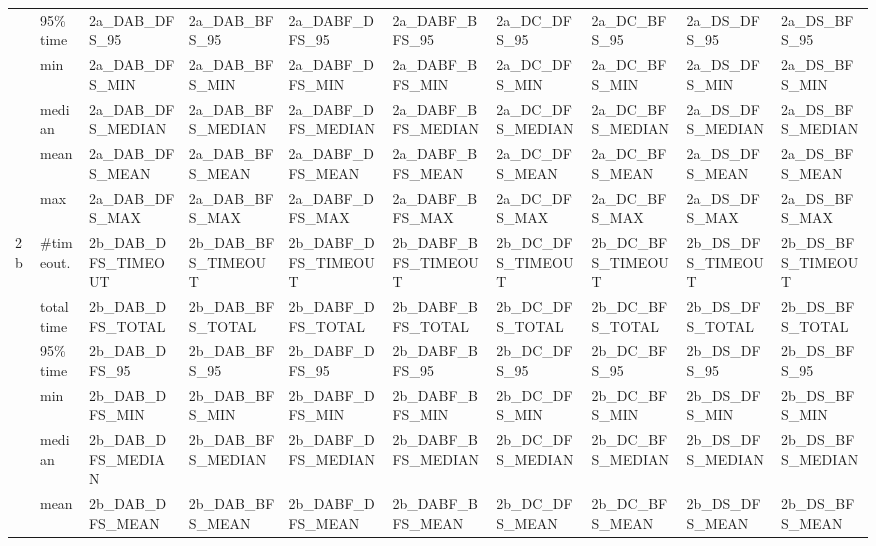 \begin{table}
{\begin{tabular}{|l|l|l|l|l|l|l|l|l|l|}
                      & 95\% time  & 2a_DAB_DFS_95      & 2a_DAB_BFS_95      & 2a_DABF_DFS_95      & 2a_DABF_BFS_95      & 2a_DC_DFS_95      & 2a_DC_BFS_95      & 2a_DS_DFS_95      & 2a_DS_BFS_95       \\ 
\cline{2-10}
                      & min        & 2a_DAB_DFS_MIN     & 2a_DAB_BFS_MIN     & 2a_DABF_DFS_MIN     & 2a_DABF_BFS_MIN     & 2a_DC_DFS_MIN     & 2a_DC_BFS_MIN     & 2a_DS_DFS_MIN     & 2a_DS_BFS_MIN       \\
                      & median     & 2a_DAB_DFS_MEDIAN  & 2a_DAB_BFS_MEDIAN  & 2a_DABF_DFS_MEDIAN  & 2a_DABF_BFS_MEDIAN  & 2a_DC_DFS_MEDIAN  & 2a_DC_BFS_MEDIAN  & 2a_DS_DFS_MEDIAN  & 2a_DS_BFS_MEDIAN       \\
                      & mean       & 2a_DAB_DFS_MEAN    & 2a_DAB_BFS_MEAN    & 2a_DABF_DFS_MEAN    & 2a_DABF_BFS_MEAN    & 2a_DC_DFS_MEAN    & 2a_DC_BFS_MEAN    & 2a_DS_DFS_MEAN    & 2a_DS_BFS_MEAN       \\
                      & max        & 2a_DAB_DFS_MAX     & 2a_DAB_BFS_MAX     & 2a_DABF_DFS_MAX     & 2a_DABF_BFS_MAX     & 2a_DC_DFS_MAX     & 2a_DC_BFS_MAX     & 2a_DS_DFS_MAX     & 2a_DS_BFS_MAX       \\
\hline
\hline
\multirow{7}{*}{2b}   & \#timeout. & 2b_DAB_DFS_TIMEOUT & 2b_DAB_BFS_TIMEOUT & 2b_DABF_DFS_TIMEOUT & 2b_DABF_BFS_TIMEOUT & 2b_DC_DFS_TIMEOUT & 2b_DC_BFS_TIMEOUT & 2b_DS_DFS_TIMEOUT & 2b_DS_BFS_TIMEOUT  \\
                      & total time & 2b_DAB_DFS_TOTAL   & 2b_DAB_BFS_TOTAL   & 2b_DABF_DFS_TOTAL   & 2b_DABF_BFS_TOTAL   & 2b_DC_DFS_TOTAL   & 2b_DC_BFS_TOTAL   & 2b_DS_DFS_TOTAL   & 2b_DS_BFS_TOTAL    \\
                      & 95\% time  & 2b_DAB_DFS_95      & 2b_DAB_BFS_95      & 2b_DABF_DFS_95      & 2b_DABF_BFS_95      & 2b_DC_DFS_95      & 2b_DC_BFS_95      & 2b_DS_DFS_95      & 2b_DS_BFS_95       \\ 
\cline{2-10}
                      & min        & 2b_DAB_DFS_MIN     & 2b_DAB_BFS_MIN     & 2b_DABF_DFS_MIN     & 2b_DABF_BFS_MIN     & 2b_DC_DFS_MIN     & 2b_DC_BFS_MIN     & 2b_DS_DFS_MIN     & 2b_DS_BFS_MIN       \\
                      & median     & 2b_DAB_DFS_MEDIAN  & 2b_DAB_BFS_MEDIAN  & 2b_DABF_DFS_MEDIAN  & 2b_DABF_BFS_MEDIAN  & 2b_DC_DFS_MEDIAN  & 2b_DC_BFS_MEDIAN  & 2b_DS_DFS_MEDIAN  & 2b_DS_BFS_MEDIAN       \\
                      & mean       & 2b_DAB_DFS_MEAN    & 2b_DAB_BFS_MEAN    & 2b_DABF_DFS_MEAN    & 2b_DABF_BFS_MEAN    & 2b_DC_DFS_MEAN    & 2b_DC_BFS_MEAN    & 2b_DS_DFS_MEAN    & 2b_DS_BFS_MEAN       \\

\end{tabular}}
\end{table}
